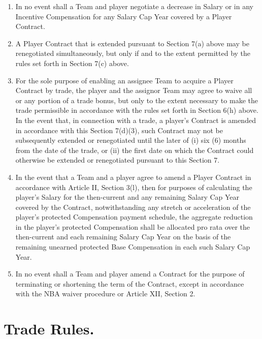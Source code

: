 \documentclass[
]{book}
\providecommand{\tightlist}{%
  \setlength{\itemsep}{0pt}\setlength{\parskip}{0pt}}
\begin{document}
\begin{enumerate}
  \begin{enumerate}
  \def\labelenumii{(\arabic{enumii})}
  \tightlist
  \item
    In no event shall a Team and player negotiate a decrease in Salary or in any Incentive Compensation for any Salary Cap Year covered by a Player Contract.
  \item
    A Player Contract that is extended pursuant to Section 7(a) above may be renegotiated simultaneously, but only if and to the extent permitted by the rules set forth in Section 7(c) above.
  \item
    For the sole purpose of enabling an assignee Team to acquire a Player Contract by trade, the player and the assignor Team may agree to waive all or any portion of a trade bonus, but only to the extent necessary to make the trade permissible in accordance with the rules set forth in Section 6(h) above. In the event that, in connection with a trade, a player's Contract is amended in accordance with this Section 7(d)(3), such Contract may not be subsequently extended or renegotiated until the later of (i) six (6) months from the date of the trade, or (ii) the first date on which the Contract could otherwise be extended or renegotiated pursuant to this Section 7.
  \item
    In the event that a Team and a player agree to amend a Player Contract in accordance with Article II, Section 3(l), then for purposes of calculating the player's Salary for the then-current and any remaining Salary Cap Year covered by the Contract, notwithstanding any stretch or acceleration of the player's protected Compensation payment schedule, the aggregate reduction in the player's protected Compensation shall be allocated pro rata over the then-current and each remaining Salary Cap Year on the basis of the remaining unearned protected Base Compensation in each such Salary Cap Year.
  \item
    In no event shall a Team and player amend a Contract for the purpose of terminating or shortening the term of the Contract, except in accordance with the NBA waiver procedure or Article XII, Section 2.
  \end{enumerate}
\end{enumerate}

\hypertarget{trade-rules.}{%
\section{Trade Rules.}\label{trade-rules.}}
\end{document}
